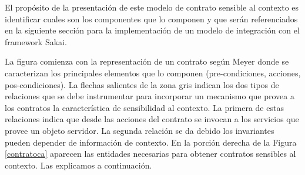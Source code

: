 El propósito de la presentación de este modelo de contrato sensible al contexto es identificar cuales son los componentes que lo componen y que serán referenciados en la siguiente sección para la implementación de un modelo de integración con el framework Sakai. 

La figura comienza con la representación de un contrato según Meyer donde se caracterizan los principales elementos que lo componen (pre-condiciones, acciones, pos-condiciones). La flechas salientes de la zona gris indican los dos tipos de relaciones que se debe instrumentar para incorporar un mecanismo que provea a los contratos la característica de sensibilidad al contexto. La primera de estas relaciones indica que desde las acciones del contrato se invocan a los servicios que provee un objeto servidor. La segunda relación se da debido los invariantes pueden depender de información de contexto. En la porción derecha de la Figura \ref{contratoca} aparecen las entidades necesarias para obtener contratos sensibles al contexto. Las explicamos a continuación.  

